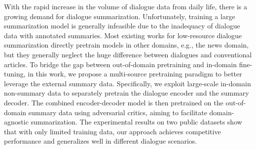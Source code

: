 With the rapid increase in the volume of dialogue data from daily life, there is a growing demand for dialogue summarization. Unfortunately, training a large summarization model is generally infeasible due to the inadequacy of dialogue data with annotated summaries. Most existing works for low-resource dialogue summarization directly pretrain models in other domains, e.g., the news domain, but they generally neglect the huge difference between dialogues and conventional articles. To bridge the gap between out-of-domain pretraining and in-domain fine-tuning, in this work, we propose a multi-source pretraining paradigm to better leverage the external summary data. Specifically, we exploit large-scale in-domain non-summary data to separately pretrain the dialogue encoder and the summary decoder. The combined encoder-decoder model is then pretrained on the out-of-domain summary data using adversarial critics, aiming to facilitate domain-agnostic summarization. The experimental results on two public datasets show that with only limited training data, our approach achieves competitive performance and generalizes well in different dialogue scenarios.
